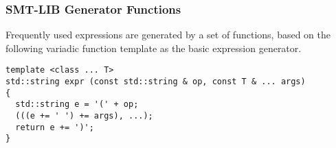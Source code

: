 
\subsubsection{SMT-LIB Generator Functions}





Frequently used \SMTLIB expressions are generated by a set of functions, based on the following variadic function template as the basic expression generator.

\begin{lstlisting}[style=c++]
template <class ... T>
std::string expr (const std::string & op, const T & ... args)
{
  std::string e = '(' + op;
  (((e += ' ') += args), ...);
  return e += ')';
}
\end{lstlisting}

